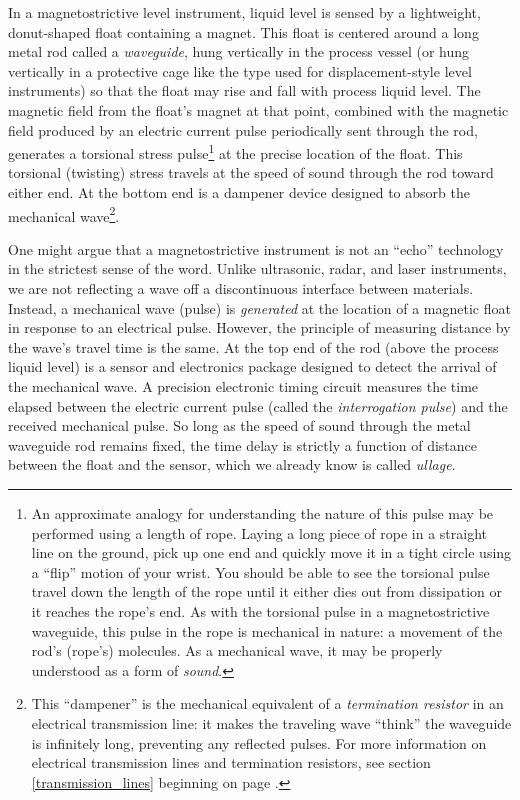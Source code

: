 In a magnetostrictive level instrument, liquid level is sensed by a lightweight, donut-shaped float containing a magnet.  This float is centered around a long metal rod called a \textit{waveguide}, hung vertically in the process vessel (or hung vertically in a protective cage like the type used for displacement-style level instruments) so that the float may rise and fall with process liquid level.  The magnetic field from the float's magnet at that point, combined with the magnetic field produced by an electric current pulse periodically sent through the rod, generates a torsional stress pulse\footnote{An approximate analogy for understanding the nature of this pulse may be performed using a length of rope.  Laying a long piece of rope in a straight line on the ground, pick up one end and quickly move it in a tight circle using a ``flip'' motion of your wrist.  You should be able to see the torsional pulse travel down the length of the rope until it either dies out from dissipation or it reaches the rope's end.  As with the torsional pulse in a magnetostrictive waveguide, this pulse in the rope is mechanical in nature: a movement of the rod's (rope's) molecules.  As a mechanical wave, it may be properly understood as a form of \textit{sound}.} at the precise location of the float.  This torsional (twisting) stress travels at the speed of sound through the rod toward either end.  At the bottom end is a dampener device designed to absorb the mechanical wave\footnote{This ``dampener'' is the mechanical equivalent of a \textit{termination resistor} in an electrical transmission line: it makes the traveling wave ``think'' the waveguide is infinitely long, preventing any reflected pulses.  For more information on electrical transmission lines and termination resistors, see section \ref{transmission_lines} beginning on page \pageref{transmission_lines}.}.  

One might argue that a magnetostrictive instrument is not an ``echo'' technology in the strictest sense of the word.  Unlike ultrasonic, radar, and laser instruments, we are not reflecting a wave off a discontinuous interface between materials.  Instead, a mechanical wave (pulse) is \textit{generated} at the location of a magnetic float in response to an electrical pulse.  However, the principle of measuring distance by the wave's travel time is the same.  At the top end of the rod (above the process liquid level) is a sensor and electronics package designed to detect the arrival of the mechanical wave.  A precision electronic timing circuit measures the time elapsed between the electric current pulse (called the \textit{interrogation pulse}) and the received mechanical pulse.  So long as the speed of sound through the metal waveguide rod remains fixed, the time delay is strictly a function of distance between the float and the sensor, which we already know is called \textit{ullage}.  

